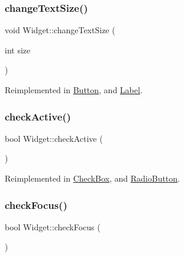 \mbox{\label{class_widget_a958763d528cd422de5f248d83530f68b}} 
\subsubsection{\texorpdfstring{changeTextSize()}{changeTextSize()}}
{\footnotesize\ttfamily void Widget\+::change\+Text\+Size (\begin{DoxyParamCaption}\item[{int}]{size }\end{DoxyParamCaption})\hspace{0.3cm}{\ttfamily [virtual]}}



Reimplemented in \mbox{\hyperlink{class_button_a21ed9f803ceeef9c846191f2ed26a2f3}{Button}}, and \mbox{\hyperlink{class_label_aa3989f512cbeabf9864c090b1d7e0c9b}{Label}}.

\mbox{\label{class_widget_ac87a7f54a06b9a2329884175f6a9c837}} 
\subsubsection{\texorpdfstring{checkActive()}{checkActive()}}
{\footnotesize\ttfamily bool Widget\+::check\+Active (\begin{DoxyParamCaption}{ }\end{DoxyParamCaption})\hspace{0.3cm}{\ttfamily [virtual]}}



Reimplemented in \mbox{\hyperlink{class_check_box_a7c03915fe705fd35e2d1934c00d2c3e8}{Check\+Box}}, and \mbox{\hyperlink{class_radio_button_ad4e47880a03d6854e5664817015187a2}{Radio\+Button}}.

\mbox{\label{class_widget_ac8121758d9fcfedb4ff119abeb7d0652}} 
\subsubsection{\texorpdfstring{checkFocus()}{checkFocus()}}
{\footnotesize\ttfamily bool Widget\+::check\+Focus (\begin{DoxyParamCaption}{ }\end{DoxyParamCaption})\hspace{0.3cm}{\ttfamily [virtual]}}



